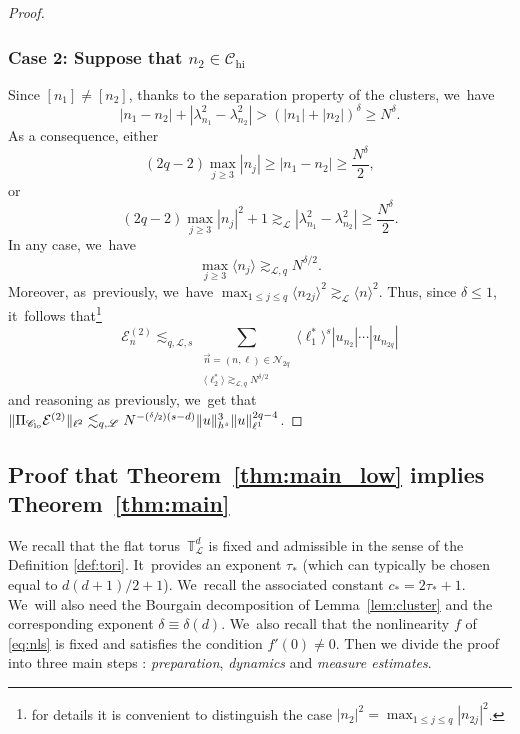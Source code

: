 \documentclass[JEP,XML,SOM,Unicode,published]{cedram}
\newcommand{\Psfrac}[2]{(\sfrac{#1}{#2})}
\theoremstyle{plain}
\theoremstyle{definition}
\DeclareMathOperator{\hi}{hi}
\DeclareMathOperator{\lo}{lo}
\newcommand{\1}{\mathbf{1}}
\newcommand{\Clo}{\mathscr{C}_{\lo}}
\newcommand{\Chigh}{\mathscr{C}_{\hi}}
\begin{document}
\begin{proof}
\subsubsection*{Case 2: Suppose that $n_2 \in \Chigh$}
Since $[n_1] \neq [n_2]$, thanks to the separation property of the clusters, we~have
\[
|n_1-n_2| + |\lambda_{n_{1}}^{2}-\lambda_{n_{2}}^{2}| > (|n_1|+|n_2|)^{\delta} \geq N^{\delta}.
\]
As a consequence, either\vspace*{-3pt}
\[
(2q-2) \max_{j\geq 3} |n_j| \geq |n_1-n_2| \geq \frac{N^{\delta}}2,
\]
or\vspace*{-3pt}
\[
(2q-2) \max_{j\geq 3} |n_j|^2 + 1 \gtrsim_{\mathscr{L}} |\lambda_{n_{1}}^{2}-\lambda_{n_{2}}^{2}| \geq \frac{N^{\delta}}2.
\]
In any case, we~have
\[
\max_{j\geq 3} \langle n_j \rangle \gtrsim_{\mathscr{L},q} N^{\delta/2}.
\]
Moreover, as~previously, we~have $\max_{1\leq j \leq q} \langle n_{2j} \rangle^2 \gtrsim_{\mathscr{L}} \langle n\rangle^2$. Thus,
since $\delta \leq 1$, it~follows that\footnote{for details it is convenient to distinguish the case $|n_2|^2=\max_{1\leq j \leq q} |n_{2j}|^2$.}
\[
\mathcal{E}^{(2)}_n \lesssim_{q,\mathscr{L},s} \sum_{\substack{\vec{n}=(n,\ell)\in\mathcal{N}_{2q} \\ \langle \ell_2^* \rangle \gtrsim_{\mathscr{L},q} N^{\delta/2} }} \langle \ell_1^\ast \rangle^{s} |u_{n_{2}}|\cdots|u_{n_{2q}}|
\]
and reasoning as previously, we~get that
$\| \Pi_{\Clo} \mathcal{E}^{(2)} \|_{\ell^2} \lesssim_{q,\mathscr{L}} N^{-\Psfrac{\delta}2(s-d)}\|u\|_{h^{s}}^{3}\|u\|_{\ell^{1}}^{2q-4}$.
\end{proof}

\subsection{Proof that Theorem~\ref{thm:main_low} implies Theorem~\ref{thm:main}}
\label{sub:a-b}

We recall that the flat torus~$\mathbb{T}^d_{\mathscr{L}}$ is fixed and admissible in the sense of the Definition \ref{def:tori}. It~provides an exponent $\tau_\ast$ (which can typically be chosen equal to $d(d+1)/2+1$). We~recall the associated constant $c_\ast = 2 \tau_\ast+1$. We~will also need the Bourgain decomposition of Lemma~\ref{lem:cluster} and the corresponding exponent $\delta \equiv \delta(d)$. We~also recall that the nonlinearity $f$ of \eqref{eq:nls} is fixed and satisfies the condition $f'(0) \neq 0$. Then we divide the proof into three main steps : \emph{preparation}, \emph{dynamics} and \emph{measure estimates}.
\end{document}
